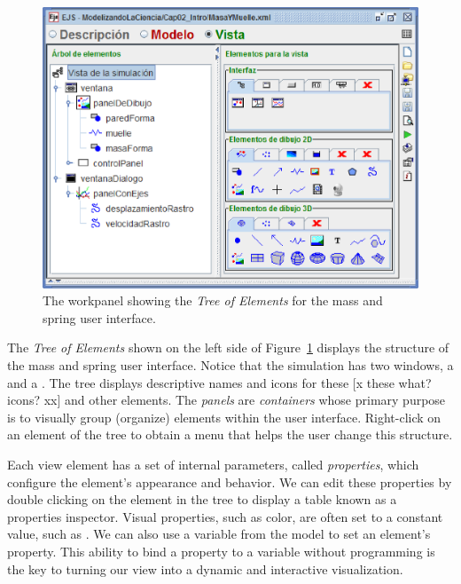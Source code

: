 \begin{figure}[htb]
    \centering
  \includegraphics[scale=\scale]{02EjsIntro/images/View.eps}
    \caption{The  workpanel showing the \emph{Tree of Elements} for the mass and spring user interface.}
    \label{fig:02EjsIntro/View}
\end{figure}

The \emph{Tree of Elements} shown on the left side of Figure~\ref{fig:02EjsIntro/View} displays the structure of the mass and spring user interface. Notice that the simulation has two windows, a  and a .  The tree displays descriptive names and icons for these [x these what? icons? xx] and other elements.  The \emph{panels} are \emph{containers} whose primary purpose is to visually group (organize) elements within the user interface. Right-click on an element of the tree to obtain a menu that helps the user change this structure.

Each view element has a set of internal parameters, called \emph{properties}, which configure the element's appearance and behavior. We can edit these properties by double clicking on the element in the tree to display a table known as a properties inspector.  Visual properties, such as color, are often set to a constant value, such as . We can also use a variable from the model to set an element's property. This ability to bind a property to a variable without programming is the key to turning our view into a dynamic and interactive visualization.

